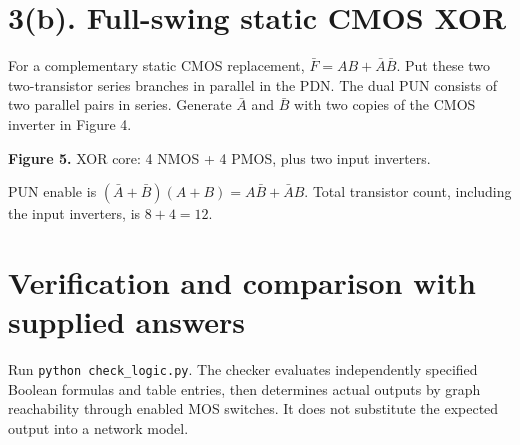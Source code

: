 \documentclass[11pt,a4paper]{article}
\newcommand{\DD}{V_{\mathrm{DD}}}
\newcommand{\NM}[4]{%
  \coordinate (#1t) at (#2,{#3+.5});\coordinate (#1b) at (#2,{#3-.5});
  \draw (#1t)--(#2,{#3+.28})--({#2+.12},{#3+.28})--({#2+.12},{#3-.28})--(#2,{#3-.28})--(#1b);
  \draw ({#2-.14},{#3-.2})--({#2-.14},{#3+.2});
  \draw ({#2-.55},#3)--({#2-.14},#3);
  \node[anchor=east] at ({#2-.62},#3) {$#4$};}
\newcommand{\PM}[4]{%
  \coordinate (#1t) at (#2,{#3+.5});\coordinate (#1b) at (#2,{#3-.5});
  \draw (#1t)--(#2,{#3+.28})--({#2+.12},{#3+.28})--({#2+.12},{#3-.28})--(#2,{#3-.28})--(#1b);
  \draw ({#2-.14},{#3-.2})--({#2-.14},{#3+.2});
  \draw ({#2-.55},#3)--({#2-.35},#3);
  \draw ({#2-.295},#3) circle[radius=.055];
  \draw ({#2-.24},#3)--({#2-.14},#3);
  \node[anchor=east] at ({#2-.62},#3) {$#4$};}
\newcommand{\groundat}[2]{\draw (#1,#2)--(#1,{#2-.13});
  \draw ({#1-.28},{#2-.13})--({#1+.28},{#2-.13});
  \draw ({#1-.18},{#2-.22})--({#1+.18},{#2-.22});
  \draw ({#1-.08},{#2-.31})--({#1+.08},{#2-.31});}
\begin{document}
\section*{3(b). Full-swing static CMOS XOR}
For a complementary static CMOS replacement,
$\bar F=AB+\bar A\bar B$. Put these two two-transistor series branches in
parallel in the PDN. The dual PUN consists of two parallel pairs in series.
Generate $\bar A$ and $\bar B$ with two copies of the CMOS inverter in Figure 4.

\begin{center}
\par
\textbf{Figure 5.} XOR core: 4 NMOS + 4 PMOS, plus two input inverters.
\end{center}
PUN enable is $(\bar A+\bar B)(A+B)=A\bar B+\bar AB$.
Total transistor count, including the input inverters, is $8+4=\boxed{12}$.

\newpage
\section*{Verification and comparison with supplied answers}
Run \texttt{python check\_logic.py}. The checker evaluates independently
specified Boolean formulas and table entries, then determines actual outputs
by graph reachability through enabled MOS switches. It does not substitute
the expected output into a network model.
\end{document}
